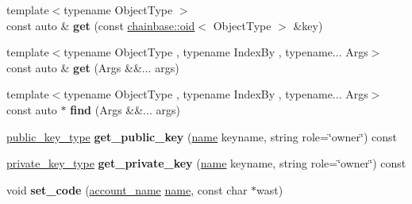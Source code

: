 \begin{DoxyCompactItemize}
\item 
\mbox{\label{classaacio_1_1testing_1_1base__tester_ad16b7b4603cb9ac3c94b0923ca138a43}} 
{\footnotesize template$<$typename Object\+Type $>$ }\\const auto \& {\bfseries get} (const \mbox{\hyperlink{classchainbase_1_1oid}{chainbase\+::oid}}$<$ Object\+Type $>$ \&key)
\item 
\mbox{\label{classaacio_1_1testing_1_1base__tester_a70e57884d840459399f6b2dccd18711f}} 
{\footnotesize template$<$typename Object\+Type , typename Index\+By , typename... Args$>$ }\\const auto \& {\bfseries get} (Args \&\&... args)
\item 
\mbox{\label{classaacio_1_1testing_1_1base__tester_abb350b3c7142b39015f3cee27bce7964}} 
{\footnotesize template$<$typename Object\+Type , typename Index\+By , typename... Args$>$ }\\const auto $\ast$ {\bfseries find} (Args \&\&... args)
\item 
\mbox{\label{classaacio_1_1testing_1_1base__tester_abdedbf1ce468cd03db89bc80a6cf31ff}} 
\mbox{\hyperlink{classfc_1_1crypto_1_1public__key}{public\+\_\+key\+\_\+type}} {\bfseries get\+\_\+public\+\_\+key} (\mbox{\hyperlink{structaacio_1_1chain_1_1name}{name}} keyname, string role=\char`\"{}owner\char`\"{}) const
\item 
\mbox{\label{classaacio_1_1testing_1_1base__tester_a36a30b05417dfee3cc102dbe35a09deb}} 
\mbox{\hyperlink{classfc_1_1crypto_1_1private__key}{private\+\_\+key\+\_\+type}} {\bfseries get\+\_\+private\+\_\+key} (\mbox{\hyperlink{structaacio_1_1chain_1_1name}{name}} keyname, string role=\char`\"{}owner\char`\"{}) const
\item 
\mbox{\label{classaacio_1_1testing_1_1base__tester_ad4b251119065313d9a84f2fd21449149}} 
void {\bfseries set\+\_\+code} (\mbox{\hyperlink{structaacio_1_1chain_1_1name}{account\+\_\+name}} \mbox{\hyperlink{structaacio_1_1chain_1_1name}{name}}, const char $\ast$wast)
\item 
\mbox{\label{classaacio_1_1testing_1_1base__tester_a26f1448e94f00e441541a54e64bdfae5}} 

\end{DoxyCompactItemize}
